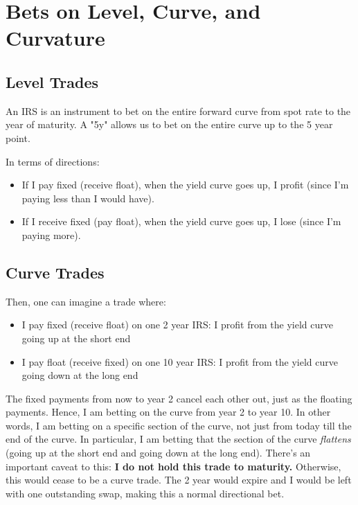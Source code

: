 \section{Bets on Level, Curve, and Curvature}

\subsection{Level Trades}

An IRS is an instrument to bet on the entire forward curve from spot rate to the year of maturity. A "5y" allows us to bet on the entire curve up to the 5 year point.

In terms of directions:

\begin{itemize}
\item If I pay fixed (receive float), when the yield curve goes up, I profit (since I'm paying less than I would have).
\item If I receive fixed (pay float), when the yield curve goes up, I lose (since I'm paying more).
\end{itemize}

\subsection{Curve Trades}

Then, one can imagine a trade where:

\begin{itemize}
\item I pay fixed (receive float) on one 2 year IRS: I profit from the yield curve going up at the short end
\item I pay float (receive fixed) on one 10 year IRS: I profit from the yield curve going down at the long end
\end{itemize}

The fixed payments from now to year 2 cancel each other out, just as the floating payments. Hence, I am betting on the curve from year 2 to year 10. In other words, I am betting on a specific section of the curve, not just from today till the end of the curve. In particular, I am betting that the section of the curve \emph{flattens} (going up at the short end and going down at the long end). There's an important caveat to this: \textbf{I do not hold this trade to maturity.} Otherwise, this would cease to be a curve trade. The 2 year would expire and I would be left with one outstanding swap, making this a normal directional bet.

